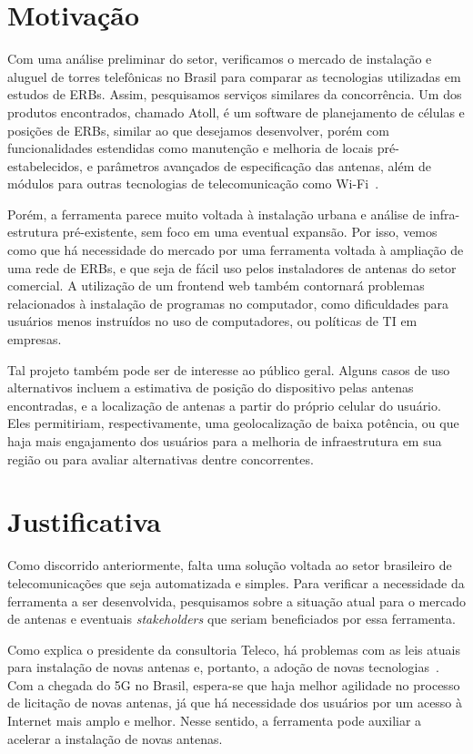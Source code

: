 \documentclass[]{politex}
\begin{document}
\section{Motivação}
Com uma análise preliminar do setor, verificamos o mercado de instalação e
aluguel de torres telefônicas no Brasil para comparar as tecnologias utilizadas
em estudos de ERBs. Assim, pesquisamos serviços similares da concorrência. Um
dos produtos encontrados, chamado Atoll, é um software de planejamento de
células e posições de ERBs, similar ao que desejamos desenvolver, porém com
funcionalidades estendidas como manutenção e melhoria de locais
pré-estabelecidos, e parâmetros avançados de especificação das antenas, além de
módulos para outras tecnologias de telecomunicação como Wi-Fi~\cite{atoll}.

Porém, a ferramenta parece muito voltada à instalação urbana e análise de
infra-estrutura pré-existente, sem foco em uma eventual expansão. Por isso,
vemos como que há necessidade do mercado por uma ferramenta voltada à ampliação
de uma rede de ERBs, e que seja de fácil uso pelos instaladores de antenas do
setor comercial. A utilização de um frontend web também contornará problemas
relacionados à instalação de programas no computador, como dificuldades para
usuários menos instruídos no uso de computadores, ou políticas de TI em
empresas.

Tal projeto também pode ser de interesse ao público geral. Alguns casos de uso
alternativos incluem a estimativa de posição do dispositivo pelas antenas
encontradas, e a localização de antenas a partir do próprio celular do usuário.
Eles permitiriam, respectivamente, uma geolocalização de baixa potência, ou que
haja mais engajamento dos usuários para a melhoria de infraestrutura em sua
região ou para avaliar alternativas dentre concorrentes.

\section{Justificativa}
Como discorrido anteriormente, falta uma solução voltada ao setor brasileiro de
telecomunicações que seja automatizada e simples. Para verificar a necessidade
da ferramenta a ser desenvolvida, pesquisamos sobre a situação atual para o
mercado de antenas e eventuais \textit{stakeholders} que seriam beneficiados
por essa ferramenta.

Como explica o presidente da consultoria Teleco, há problemas com as leis atuais
para instalação de novas antenas e, portanto, a adoção de novas
tecnologias~\cite{tude}. Com a chegada do 5G no Brasil, espera-se que haja
melhor agilidade no processo de licitação de novas antenas, já que há
necessidade dos usuários por um acesso à Internet mais amplo e melhor. Nesse
sentido, a ferramenta pode auxiliar a acelerar a instalação de novas antenas.
\end{document}
